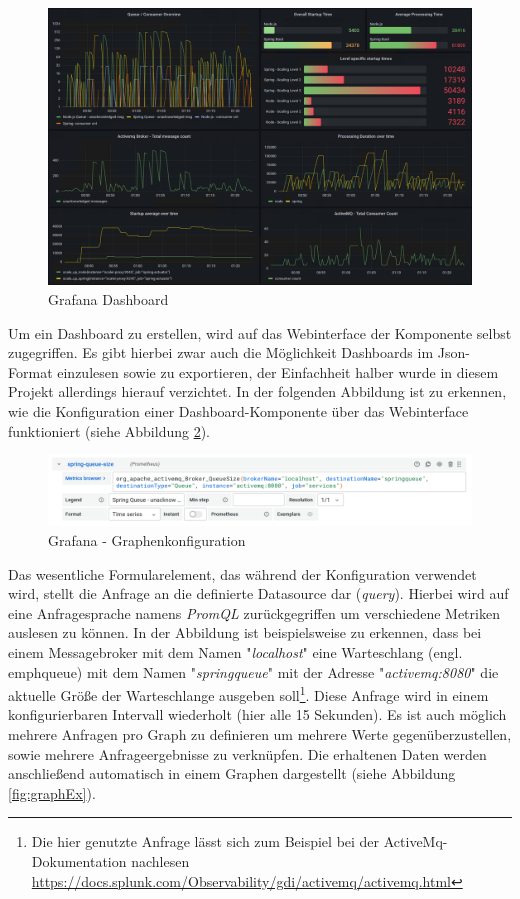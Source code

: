 \begin{figure}
	\centering
	\includegraphics[width=\linewidth]{kapitel/problemloesung/implementierung/_img/grafana-dashboard-01}
	\caption[]{Grafana Dashboard}
	\label{fig:grafanaOverview}
\end{figure}

Um ein Dashboard zu erstellen, wird auf das Webinterface der Komponente selbst zugegriffen. Es gibt hierbei zwar auch die Möglichkeit Dashboards im Json-Format einzulesen sowie zu exportieren, der Einfachheit halber wurde in diesem Projekt allerdings hierauf verzichtet. In der folgenden Abbildung ist zu erkennen, wie die Konfiguration einer Dashboard-Komponente über das Webinterface funktioniert (siehe Abbildung \ref{fig:grafanaPromQl}). 

\begin{figure}
	\centering
	\includegraphics[width=\linewidth]{kapitel/problemloesung/implementierung/_img/grafana-promql}
	\caption[]{Grafana - Graphenkonfiguration}
	\label{fig:grafanaPromQl}
\end{figure}

Das wesentliche Formularelement, das während der Konfiguration verwendet wird, stellt die Anfrage an die definierte Datasource dar (\emph{query}). Hierbei wird auf eine Anfragesprache namens \emph{PromQL} zurückgegriffen um verschiedene Metriken auslesen zu können. In der Abbildung ist beispielsweise zu erkennen, dass bei einem Messagebroker mit dem Namen "\emph{localhost}" eine Warteschlang (engl. emph{queue}) mit dem Namen "\emph{springqueue}" mit der Adresse "\emph{activemq:8080}" die aktuelle Größe der Warteschlange ausgeben soll\footnote{Die hier genutzte Anfrage lässt sich zum Beispiel bei der ActiveMq-Dokumentation nachlesen \url{https://docs.splunk.com/Observability/gdi/activemq/activemq.html}}. Diese Anfrage wird in einem konfigurierbaren Intervall wiederholt (hier alle 15 Sekunden). Es ist auch möglich mehrere Anfragen pro Graph zu definieren um mehrere Werte gegenüberzustellen, sowie mehrere Anfrageergebnisse zu verknüpfen. Die erhaltenen Daten werden anschließend automatisch in einem Graphen dargestellt (siehe Abbildung \ref{fig:graphEx}). 

